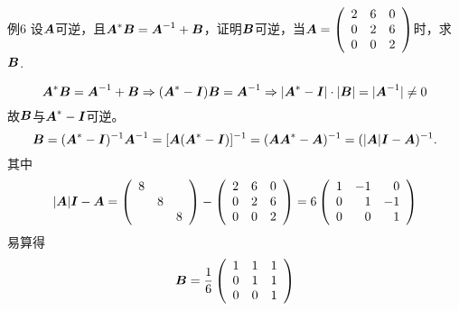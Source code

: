 \begin{frame}
  \begin{footnotesize}
    \begin{exampleblock}{例6}
      设$\boldsymbol{A}$可逆，且$\boldsymbol{A}^*\boldsymbol{B} = \boldsymbol{A}^{-1}+\boldsymbol{B}$，证明$\boldsymbol{B}$可逆，当$\boldsymbol{A}=\left(
      \begin{array}{ccc}
        2 & 6 & 0 \\
        0 & 2 & 6\\
        0 & 0 & 2
      \end{array}
      \right)$时，求$\boldsymbol{B}$.
    \end{exampleblock}
    \pause 
    \jiename
    $$
    \boldsymbol{A}^*\boldsymbol{B} = \boldsymbol{A}^{-1}+\boldsymbol{B}  \Rightarrow (\boldsymbol{A}^*-\boldsymbol{I})\boldsymbol{B} = \boldsymbol{A}^{-1}
    \Rightarrow |\boldsymbol{A}^*-\boldsymbol{I}|\cdot |\boldsymbol{B}| = |\boldsymbol{A}^{-1}|\ne 0 
    $$
    故$\boldsymbol{B}$与$\boldsymbol{A}^*-\boldsymbol{I}$可逆。
    \pause 
    $$
    \boldsymbol{B} = (\boldsymbol{A}^*-\boldsymbol{I})^{-1} \boldsymbol{A}^{-1} = [\boldsymbol{A}(\boldsymbol{A}^*-\boldsymbol{I})]^{-1} = (\boldsymbol{A}\boldsymbol{A}^*-\boldsymbol{A})^{-1} = (|\boldsymbol{A}|\boldsymbol{I}-\boldsymbol{A})^{-1}.
    $$
    其中
    $$
    |\boldsymbol{A}|\boldsymbol{I}-\boldsymbol{A} = \left(
    \begin{array}{ccc}
      8 & &\\
      & 8 &\\
      & & 8
    \end{array}
    \right) - \left(
    \begin{array}{ccc}
      2 & 6 & 0 \\
      0 & 2 & 6\\
      0 & 0 & 2
    \end{array}
    \right) = 6 \left(
    \begin{array}{rrr}
      1 & -1 & 0 \\
      0 &  1 & -1\\
      0 & 0 & 1
    \end{array}
    \right)
    $$
    \pause 
    易算得
    $$
    \boldsymbol{B} = \frac16 \left(
    \begin{array}{rrr}
      1 &  1 & 1 \\
      0 &  1 & 1\\
      0 & 0 & 1
    \end{array}
    \right)
    $$
  \end{footnotesize}
\end{frame}


